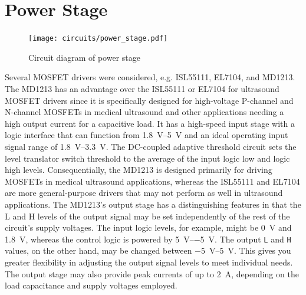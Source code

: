 \section{Power Stage}
\begin{figure}[htbp]
	\centering
	\texttt{[image: circuits/power\_stage.pdf]}
	\label{fig:3_power_stage}
	\caption{Circuit diagram of power stage}
\end{figure}
Several MOSFET drivers were considered, e.g. ISL55111\cite{ISL55111}, EL7104\cite{EL7104}, and MD1213\cite{MD1213}. The MD1213 has an advantage over the ISL55111 or EL7104 for ultrasound MOSFET drivers since it is specifically designed for high-voltage P-channel and N-channel MOSFETs in medical ultrasound and other applications needing a high output current for a capacitive load. It has a high-speed input stage with a logic interface that can function from \qtyrange{1.8}{5}{\volt} and an ideal operating input signal range of \qtyrange{1.8}{3.3}{\volt}. The DC-coupled adaptive threshold circuit sets the level translator switch threshold to the average of the input logic \gls{low} and logic \gls{high} levels. Consequentially, the MD1213 is designed primarily for driving MOSFETs in medical ultrasound applications, whereas the ISL55111 and EL7104 are more general-purpose drivers that may not perform as well in ultrasound applications. The MD1213's output stage has a distinguishing features in that the L and H levels of the output signal may be set independently of the rest of the circuit's supply voltages. The input logic levels, for example, might be \qty{0}{\volt} and \qty{1.8}{\volt}, whereas the control logic is powered by \qtyrange[retain-explicit-plus]{+5}{-5}{\volt}. The output \texttt{L} and \texttt{H} values, on the other hand, may be changed between \qtyrange[retain-explicit-plus]{-5}{+5}{\volt}. This gives you greater flexibility in adjusting the output signal levels to meet individual needs. The output stage may also provide peak currents of up to \qty{2}{\ampere}, depending on the load capacitance and supply voltages employed.

